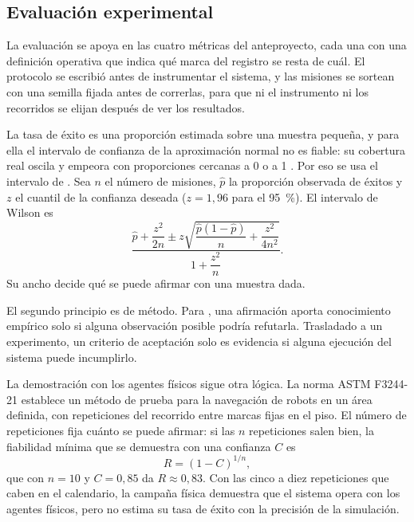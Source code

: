 \subsection{Evaluación experimental}
\label{sec:teo-evaluacion}

La evaluación se apoya en las cuatro métricas del anteproyecto, cada una con una
definición operativa que indica qué marca del registro se resta de cuál. El
protocolo se escribió antes de instrumentar el sistema, y las misiones se sortean
con una semilla fijada antes de correrlas, para que ni el instrumento ni los
recorridos se elijan después de ver los resultados.

La tasa de éxito es una proporción estimada sobre una muestra pequeña, y para ella el intervalo de confianza de la aproximación normal no es fiable: su cobertura real oscila y empeora con proporciones cercanas a 0 o a 1 \autocite{brown2001interval}. Por eso se usa el intervalo de \textcite{wilson1927probable}. Sea $n$ el
número de misiones, $\hat{p}$ la proporción observada de éxitos y $z$ el cuantil
de la confianza deseada ($z = 1{,}96$ para el 95~\%). El intervalo de Wilson es
\begin{equation}
  \frac{\hat{p} + \dfrac{z^{2}}{2n} \pm z\sqrt{\dfrac{\hat{p}(1-\hat{p})}{n} + \dfrac{z^{2}}{4n^{2}}}}{1 + \dfrac{z^{2}}{n}} .
\end{equation}
Su ancho decide qué se puede afirmar con una muestra dada.

El segundo principio es de método. Para \textcite{popper1959logic}, una
afirmación aporta conocimiento empírico solo si alguna observación posible podría
refutarla. Trasladado a un experimento, un criterio de aceptación solo es
evidencia si alguna ejecución del sistema puede incumplirlo.

La demostración con los agentes físicos sigue otra lógica. La norma ASTM
F3244-21 \autocite{astm2021f3244} establece un método de prueba para la
navegación de robots en un área definida, con repeticiones del recorrido entre
marcas fijas en el piso. El número de repeticiones fija cuánto se puede afirmar:
si las $n$ repeticiones salen bien, la fiabilidad mínima que se demuestra con una
confianza $C$ es
\begin{equation}
  R = (1-C)^{1/n} ,
\end{equation}
que con $n = 10$ y $C = 0{,}85$ da $R \approx 0{,}83$. Con las cinco a diez
repeticiones que caben en el calendario, la campaña física demuestra que el
sistema opera con los agentes físicos, pero no estima su tasa de éxito con la precisión de la simulación.

